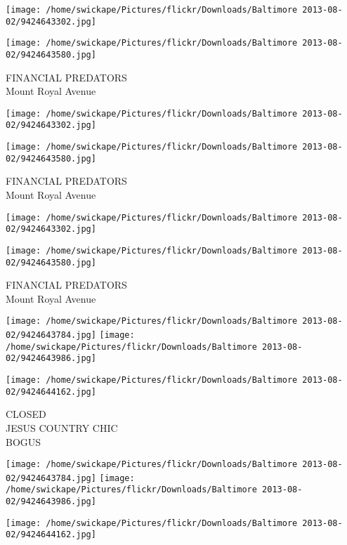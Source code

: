 \documentclass[10pt,letterpaper]{article}
\begin{document}
\texttt{[image: /home/swickape/Pictures/flickr/Downloads/Baltimore 2013-08-02/9424643302.jpg]}

\vspace{0.25in}
\texttt{[image: /home/swickape/Pictures/flickr/Downloads/Baltimore 2013-08-02/9424643580.jpg]}

FINANCIAL PREDATORS\\
Mount Royal Avenue\\
\pagebreak

\texttt{[image: /home/swickape/Pictures/flickr/Downloads/Baltimore 2013-08-02/9424643302.jpg]}

\vspace{0.25in}
\texttt{[image: /home/swickape/Pictures/flickr/Downloads/Baltimore 2013-08-02/9424643580.jpg]}

FINANCIAL PREDATORS\\
Mount Royal Avenue\\
\pagebreak

\texttt{[image: /home/swickape/Pictures/flickr/Downloads/Baltimore 2013-08-02/9424643302.jpg]}

\vspace{0.25in}
\texttt{[image: /home/swickape/Pictures/flickr/Downloads/Baltimore 2013-08-02/9424643580.jpg]}

FINANCIAL PREDATORS\\
Mount Royal Avenue\\
\pagebreak

\texttt{[image: /home/swickape/Pictures/flickr/Downloads/Baltimore 2013-08-02/9424643784.jpg]}
\texttt{[image: /home/swickape/Pictures/flickr/Downloads/Baltimore 2013-08-02/9424643986.jpg]}

\vspace{0.25in}
\texttt{[image: /home/swickape/Pictures/flickr/Downloads/Baltimore 2013-08-02/9424644162.jpg]}

CLOSED\\
JESUS COUNTRY CHIC\\
BOGUS\\
\pagebreak

\texttt{[image: /home/swickape/Pictures/flickr/Downloads/Baltimore 2013-08-02/9424643784.jpg]}
\texttt{[image: /home/swickape/Pictures/flickr/Downloads/Baltimore 2013-08-02/9424643986.jpg]}

\vspace{0.25in}
\texttt{[image: /home/swickape/Pictures/flickr/Downloads/Baltimore 2013-08-02/9424644162.jpg]}
\end{document}

